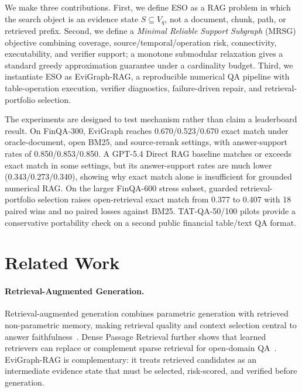 \documentclass[letterpaper]{article}
\begin{document}
We make three contributions.
First, we define ESO as a RAG problem in which the search object is an evidence state \(S\subseteq V_q\), not a document, chunk, path, or retrieved prefix.
Second, we define a \emph{Minimal Reliable Support Subgraph} (MRSG) objective combining coverage, source/temporal/operation risk, connectivity, executability, and verifier support; a monotone submodular relaxation gives a standard greedy approximation guarantee under a cardinality budget.
Third, we instantiate ESO as EviGraph-RAG, a reproducible numerical QA pipeline with table-operation execution, verifier diagnostics, failure-driven repair, and retrieval-portfolio selection.

The experiments are designed to test mechanism rather than claim a leaderboard result.
On FinQA-300, EviGraph reaches 0.670/0.523/0.670 exact match under oracle-document, open BM25, and source-rerank settings, with answer-support rates of 0.850/0.853/0.850.
A GPT-5.4 Direct RAG baseline matches or exceeds exact match in some settings, but its answer-support rates are much lower (0.343/0.273/0.340), showing why exact match alone is insufficient for grounded numerical RAG.
On the larger FinQA-600 stress subset, guarded retrieval-portfolio selection raises open-retrieval exact match from 0.377 to 0.407 with 18 paired wins and no paired losses against BM25.
TAT-QA-50/100 pilots provide a conservative portability check on a second public financial table/text QA format.

\section{Related Work}

\paragraph{Retrieval-Augmented Generation.}
Retrieval-augmented generation combines parametric generation with retrieved non-parametric memory, making retrieval quality and context selection central to answer faithfulness~\cite{lewis2020retrieval}.
Dense Passage Retrieval further shows that learned retrievers can replace or complement sparse retrieval for open-domain QA~\cite{karpukhin2020dense}.
EviGraph-RAG is complementary: it treats retrieved candidates as an intermediate evidence state that must be selected, risk-scored, and verified before generation.
\end{document}
